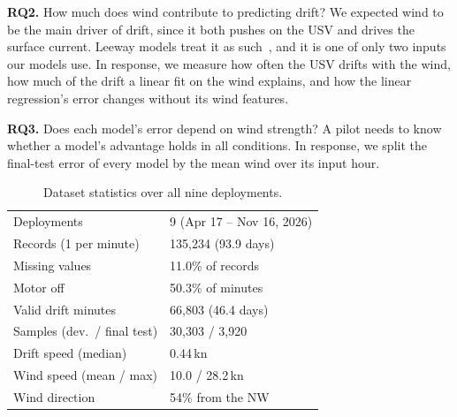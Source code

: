 \documentclass[sigconf]{acmart}
\begin{document}
\noindent\textbf{RQ2.} How much does wind contribute to predicting drift? We expected wind to be the main driver of drift, since it both pushes on the USV and drives the surface current.
Leeway models treat it as such~\cite{breivik2011leeway}, and it is one of only two inputs our models use. In response, we measure how often the USV drifts with the wind, how much of the drift a linear fit on the wind explains, and how the linear regression's error changes without its wind features.




\noindent\textbf{RQ3.} Does each model's error depend on wind strength? A pilot needs to know whether a model's advantage holds in all conditions. In response, we split the final-test error of every model by the mean wind over its input hour.

\begin{table}[t]
\centering\footnotesize
\caption{Dataset statistics over all nine deployments.}
\label{tab:dataset}
\begin{tabular}{@{}ll@{}}
\toprule
Deployments            & 9 (Apr 17 -- Nov 16, 2026) \\
Records (1 per minute) & 135{,}234 (93.9 days) \\
Missing values         & 11.0\% of records \\
Motor off              & 50.3\% of minutes \\
Valid drift minutes    & 66{,}803 (46.4 days) \\
Samples (dev.\ / final test) & 30{,}303 / 3{,}920 \\
Drift speed (median)   & 0.44\,kn \\
Wind speed (mean / max)& 10.0 / 28.2\,kn \\
Wind direction         & 54\% from the NW \\
\bottomrule
\end{tabular}
\end{table}
\end{document}
